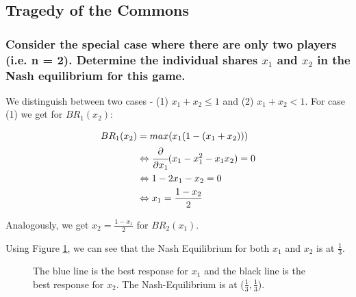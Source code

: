 
\subsection{Tragedy of the Commons}

\subsubsection{Consider the special case where there are only two players (i.e. n = 2). Determine the individual shares $x_1$ and $x_2$ in the Nash equilibrium for this game.}

We distinguish between two cases - (1) $x_1 + x_2 \leq 1$ and (2) $x_1 + x_2 < 1$.
For case (1) we get for $BR_1(x_2)$:

\begin{equation}
    \begin{split}
        BR_1(x_2)&=max(x_1(1 - (x_1 + x_2)))\\
        &\Leftrightarrow \cfrac{\partial}{\partial x_1}(x_1 - x_1^2 - x_1x_2)=0\\
        &\Leftrightarrow 1-2x_1-x_2=0\\
        &\Leftrightarrow x_1 = \frac{1-x_2}{2}\\
    \end{split}
\end{equation}

Analogously, we get $x_2 = \frac{1-x_1}{2}$ for $BR_2(x_1)$.

Using Figure \ref{fig:2_4_1}, we can see that the Nash Equilibrium for both $x_1$ and $x_2$ is at $\frac{1}{3}$.

\begin{figure}[H]
        \centering
        \caption{The blue line is the best response for $x_1$ and the black line is the best response for $x_2$. The Nash-Equilibrium is at ($\frac{1}{3}, \frac{1}{3}$).}
        \label{fig:2_4_1}
    \end{figure}

